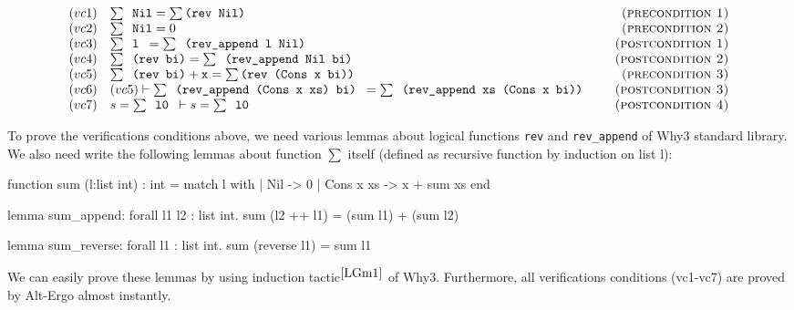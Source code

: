 \documentclass[a4paper,11pt,oneside]{article}
\theoremstyle{plain}
\begin{document}
\begin{footnotesize}
\begin{displaymath}
\begin{array}{ll@{\hspace*{2em}}r}
(vc1)
	& \sum \texttt{ Nil} = \sum \texttt{(rev Nil)}  
	& \textsc{(precondition 1)}\\

(vc2)
	& \sum \texttt{ Nil} = 0 
	& \textsc{(precondition 2)}\\

(vc3)
  & \sum \texttt{ l } = \sum \texttt{ (rev\_append l Nil) }
 	& \textsc{(postcondition 1)}\\

(vc4)
  & \sum \texttt{ (rev bi)} = \sum \texttt{ (rev\_append Nil bi)}
 	& \textsc{(postcondition 2)}\\

(vc5)
	& \sum \texttt{ (rev bi)} + \texttt{x} = \sum \texttt{(rev (Cons x bi))}  
	& \textsc{(precondition 3)}\\

(vc6)
  & (vc5)
  	\vdash
  	\sum \texttt{ (rev\_append (Cons x xs) bi) } =
  	\sum \texttt{ (rev\_append xs (Cons x bi)) } 
    
 	& \textsc{(postcondition 3)}\\
	
(vc7)
  & s = \sum \texttt{ l0 } \vdash s = \sum \texttt{ l0 }
 	& \textsc{(postcondition 4)}\\	
\end{array}
\end{displaymath}
\end{footnotesize}

To prove the verifications conditions above, we need various lemmas about logical functions \texttt{rev} and \texttt{rev\_append} of Why3 standard library. We also need write the following lemmas about function $\sum$ itself (defined as recursive function by induction on list l):   
\begin{small}
\begin{whycode}
 function sum (l:list int) : int =
     match l with
       | Nil -> 0
       | Cons x xs -> x + sum xs
     end

 lemma sum_append:
    forall l1 l2 : list int. sum (l2 ++ l1) = (sum l1) + (sum l2)

 lemma sum_reverse:
    forall l1 : list int. sum (reverse l1) = sum l1
\end{whycode}
\end{small}
We can easily prove these lemmas by using induction tactic{\footnotesize$^{ \cite{LGm1}}$} of Why3. Furthermore, all verifications conditions (vc1-vc7) are proved by Alt-Ergo almost instantly.
\end{document}
